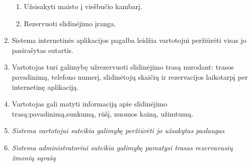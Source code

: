 \documentclass[oneside]{VUMIFPSkursinis}
\begin{document}
\begin{enumerate}
	\begin{enumerate}
		\item Užsisakyti maisto į viešbučio kambarį.
		\item Rezervuoti slidinėjimo įranga.
	\end{enumerate}
	\item Sistema internetinės aplikacijos pagalba leidžia vartotojui peržiūrėti visas jo pasirašytas sutartis.
	\item Vartotojas turi galimybę užrezervuoti slidinėjimo trasą nurodant: trasos pavadinimą, telefono numerį, slidinėtojų skaičių ir rezervacijos laikotarpį per internetinę aplikaciją.
	\item Vartotojas gali matyti informaciją apie slidinėjimo trasą:pavadinimą,sunkumą, rūšį, nuomos kainą, užimtumą.
	\item \textit{Sistema vartotojui suteikia galimybę peržiūrėti jo užsakytas paslaugas}
	\item \textit{Sistema administratoriui suteikia galimybę pamatysi trasas rezervavusių žmonių sąrašą}
\end{enumerate}
\end{document}
